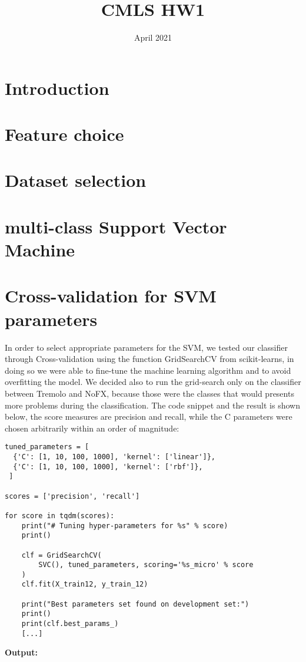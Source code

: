 \documentclass{article}
\title{CMLS HW1}
\author{}
\date{April 2021}
\begin{document}
\maketitle
\section{Introduction}
\section{Feature choice}
\section{Dataset selection}
\section{multi-class Support Vector Machine}
\section{Cross-validation for SVM parameters}
In order to select appropriate parameters for the SVM, we tested our classifier through Cross-validation using the function GridSearchCV from scikit-learns, in doing so we were able to fine-tune the machine learning algorithm and to avoid overfitting the model. We decided also to run the grid-search only on the classifier between Tremolo and NoFX, because those were the classes that would presents more problems during the classification. The code snippet and the result is shown below, the score measures are precision and recall, while the C parameters were chosen arbitrarily within an order of magnitude:
\begin{verbatim}
tuned_parameters = [
  {'C': [1, 10, 100, 1000], 'kernel': ['linear']},
  {'C': [1, 10, 100, 1000], 'kernel': ['rbf']},
 ]

scores = ['precision', 'recall']

for score in tqdm(scores):
    print("# Tuning hyper-parameters for %s" % score)
    print()

    clf = GridSearchCV(
        SVC(), tuned_parameters, scoring='%s_micro' % score
    )
    clf.fit(X_train12, y_train_12)

    print("Best parameters set found on development set:")
    print()
    print(clf.best_params_)
    [...]
\end{verbatim}
\hfill \break
\textbf{Output:}
\end{document}
